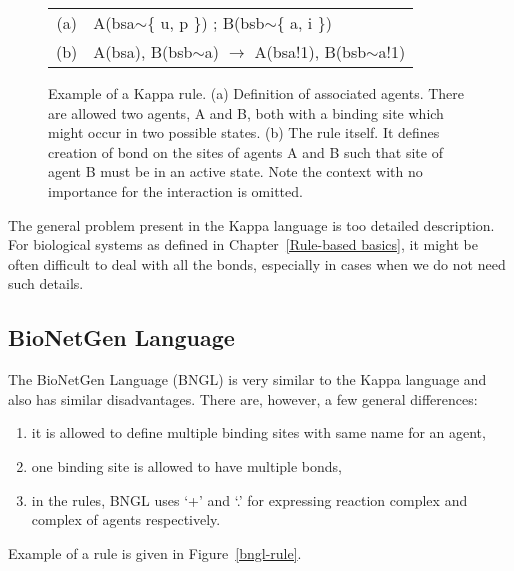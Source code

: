 \documentclass[11pt,a4paper]{report}
\begin{document}
\begin{figure}[!h]
\begin{center}
\begin{tabular}{c l}
(a) & A(bsa$\sim$\{ u, p \}) ; B(bsb$\sim$\{ a, i \}) \\
(b) & A(bsa), B(bsb$\sim$a) $\rightarrow$ A(bsa!1), B(bsb$\sim$a!1) \\
\end{tabular}
\end{center}
\caption{Example of a Kappa rule. (a) Definition of associated agents. There are allowed two agents, A and B, both with a binding site which might occur in two possible states. (b) The rule itself. It defines creation of bond on the sites of agents A and B such that site of agent B must be in an active state. Note the context with no importance for the interaction is omitted.}\label{kappa-rule}
\end{figure}

The general problem present in the Kappa language is too detailed description. For biological systems as defined in Chapter~\ref{Rule-based basics}, it might be often difficult to deal with all the bonds, especially in cases when we do not need such details.

\subsection{BioNetGen Language}
\label{bngl}

The BioNetGen Language (BNGL) \cite{BNGL} is very similar to the Kappa language and also has similar disadvantages. There are, however, a few general differences: 

\begin{enumerate}
	\item it is allowed to define multiple binding sites with same name for an agent,
	\item one binding site is allowed to have multiple bonds,
	\item in the rules, BNGL uses `+' and `.' for expressing reaction complex and complex of agents respectively.
\end{enumerate}

Example of a rule is given in Figure~\ref{bngl-rule}.
\end{document}
